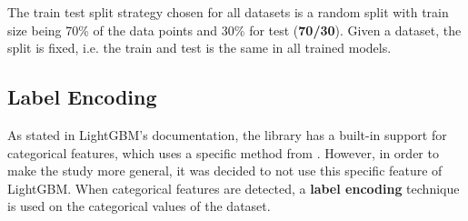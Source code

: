 The train test split strategy chosen for all datasets is a random split with train size being 70\% of the data points and 30\% for test (\textbf{70/30}). Given a dataset, the split is fixed, i.e. the train and test is the same in all trained models.

\subsection{Label Encoding}

As stated in LightGBM's documentation, the library has a built-in support for categorical features, which uses a specific method from \cite{fisher1958grouping}. However, in order to make the study more general, it was decided to not use this specific feature of LightGBM. When categorical features are detected, a \textbf{label encoding} technique is used on the categorical values of the dataset. 